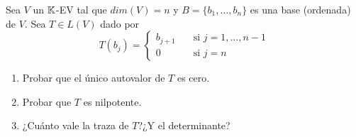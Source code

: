\item Sea $V$ un $\mathbb{K}$-EV tal que $dim(V)=n$ y $B=\{b_1,\dots,b_n\}$ es una base (ordenada) de $V$. Sea $T\in L(V)$ dado por \[T(b_j)=\begin{cases}
        b_{j+1}&\quad\text{si }j=1,\dots,n-1\\
        0&\quad\text{si }j=n
    \end{cases}\]
    \begin{enumerate}
        \item Probar que el único autovalor de $T$ es cero.
            \begin{mdframed}[style=s]
                
            \end{mdframed}
        \item Probar que $T$ es nilpotente.
            \begin{mdframed}[style=s]
                
            \end{mdframed}
        \item ¿Cuánto vale la traza de $T$?¿Y el determinante?
            \begin{mdframed}[style=s]
                
            \end{mdframed}
    \end{enumerate}
